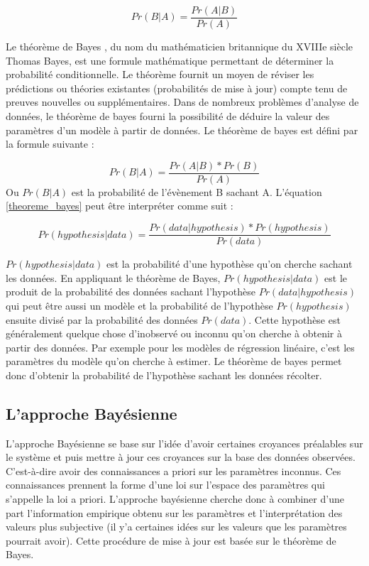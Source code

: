 \begin{equation}
	Pr(B|A) = \frac{Pr(A|B)}{Pr(A)}
	\label{conditionnelle_probability}
\end{equation}

Le théorème de Bayes , du nom du mathématicien britannique du XVIIIe siècle Thomas Bayes, est une formule mathématique permettant de déterminer la probabilité conditionnelle. Le théorème fournit un moyen de réviser les prédictions ou théories existantes (probabilités de mise à jour) compte tenu de preuves nouvelles ou supplémentaires. Dans de nombreux problèmes d'analyse de données, le théorème de bayes fourni la possibilité de déduire la valeur des paramètres d'un modèle à partir de données. Le théorème de bayes est défini par la formule suivante :

\begin{equation}
	Pr(B|A) = \frac{Pr(A|B)*Pr(B)}{Pr(A)}
	\label{theoreme_bayes}
\end{equation}
Ou \(\displaystyle Pr(B|A) \) est la probabilité de l’évènement B sachant A. L’équation \ref{theoreme_bayes} peut être interpréter comme suit :

\begin{equation}
	Pr(hypothesis|data) = \frac{Pr(data|hypothesis)*Pr(hypothesis)}{Pr(data)}
	\label{theoreme_bayes2}
\end{equation}


\(\displaystyle Pr(hypothesis|data) \) est la probabilité d’une hypothèse qu’on cherche sachant les données. En appliquant le théorème de Bayes, \(\displaystyle Pr(hypothesis|data) \)  est le produit de la probabilité des données sachant l’hypothèse \(\displaystyle Pr(data|hypothesis) \) qui peut être aussi un modèle et la probabilité de l’hypothèse \(\displaystyle Pr(hypothesis) \) ensuite divisé par la probabilité des données \(\displaystyle Pr(data) \). Cette hypothèse est généralement quelque chose d’inobservé ou inconnu qu’on cherche à obtenir à partir des données. Par exemple pour les modèles de régression linéaire, c’est les paramètres du modèle qu’on cherche à estimer. Le théorème de bayes permet donc d’obtenir la probabilité de l’hypothèse sachant les données récolter.

\subsection{L’approche Bayésienne}
L’approche Bayésienne se base sur l’idée d’avoir certaines croyances préalables sur le système et puis mettre à jour ces croyances sur la base des données observées. C’est-à-dire avoir des connaissances a priori sur les paramètres inconnus. Ces connaissances prennent la forme d’une loi sur l’espace des paramètres qui s’appelle la loi a priori. L’approche bayésienne cherche donc à combiner d’une part l’information empirique obtenu sur les paramètres et l’interprétation des valeurs plus subjective (il y’a certaines idées sur les valeurs que les paramètres pourrait avoir). Cette procédure de mise à jour est basée sur le théorème de Bayes.

